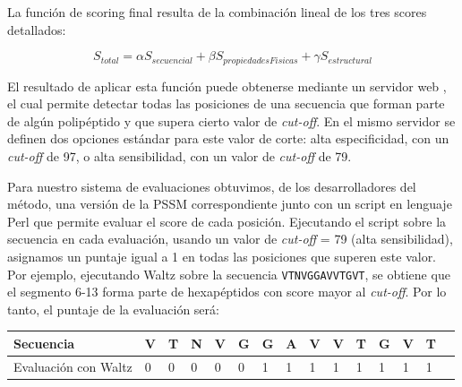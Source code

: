 La función de scoring final resulta de la combinación lineal de los tres scores detallados:

{
\large
\begin{equation}
S_{total}= \alpha S_{secuencial} + \beta S_{propiedadesFisicas} + \gamma S_{estructural}
\end{equation}
}


El resultado de aplicar esta función puede obtenerse mediante un servidor web \cite{waltzWeb}, el cual permite detectar todas las posiciones de una secuencia que forman parte de algún polipéptido y que supera cierto
valor de \textit{cut-off}. En el mismo servidor se definen dos opciones estándar para este valor de corte: alta especificidad, con un \textit{cut-off} de 97, o alta sensibilidad, con un valor de \textit{cut-off} de 79.

Para nuestro sistema de evaluaciones obtuvimos, de los desarrolladores del método, una versión de la PSSM correspondiente junto con un script en lenguaje Perl que permite evaluar el score de cada posición.
Ejecutando el script sobre la secuencia en cada evaluación, usando un valor de \textit{cut-off} = 79 (alta sensibilidad), asignamos un puntaje igual a 1 en todas las posiciones que superen este valor.
Por ejemplo, ejecutando Waltz sobre la secuencia \texttt{VTNVGGAVVTGVT}, se obtiene que el segmento 6-13 forma parte de hexapéptidos con score mayor al \textit{cut-off}. Por lo tanto, el puntaje de la evaluación será:


\vspace{0.3cm}
\noindent
\begin{center}
\begin{tabular}{lllllllllllllll} 
\hline    
Secuencia & \textbf{V} & \textbf{T} & \textbf{N} & \textbf{V} & \textbf{G} & \textbf{G} & \textbf{A} & \textbf{V} & \textbf{V} &\textbf{T} & \textbf{G} & \textbf{V} & \textbf{T}  \\ \hline
Evaluación con Waltz & 0 & 0 & 0 & 0 & 0 & 1 & 1 & 1 & 1 & 1 & 1 & 1 & 1 \\ \hline
\end{tabular}
\end{center}







